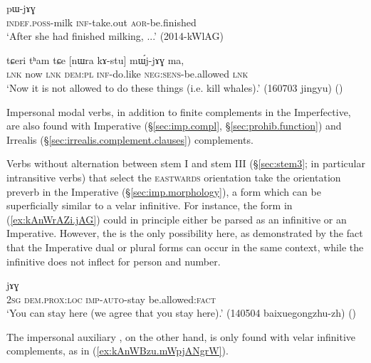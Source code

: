 \begin{exe} 
\ex \label{ex:kAtCAt.pWjAG}
\gll [tɤ-lu kɤ-tɕɤt] pɯ-jɤɣ \\
\textsc{indef}.\textsc{poss}-milk \textsc{inf}-take.out \textsc{aor}-be.finished \\
\glt `After she had finished milking, ...' (2014-kWlAG)
\end{exe} 

\begin{exe} 
\ex \label{ex:kAstu.mWjjAG}
\gll tɕeri tʰam tɕe [nɯra kɤ-stu] mɯ́j-jɤɣ ma,  \\
\textsc{lnk} now \textsc{lnk} \textsc{dem}:\textsc{pl} \textsc{inf}-do.like \textsc{neg}:\textsc{sens}-be.allowed \textsc{lnk} \\
\glt `Now it is not allowed to do these things (i.e. kill whales).' (160703 jingyu)
()
\end{exe} 

Impersonal modal verbs, in addition to finite complements in the Imperfective, are also found with Imperative (§\ref{sec:imp.compl}, §\ref{sec:prohib.function}) and Irrealis (§\ref{sec:irrealis.complement.clauses}) complements. 


Verbs without alternation between stem I and stem III (§\ref{sec:stem3}; in particular intransitive verbs) that select the \textsc{eastwards} orientation take the  orientation preverb in the Imperative (§\ref{sec:imp.morphology}), a form which can be superficially similar to a velar infinitive. For instance, the form  in (\ref{ex:kAnWrAZi.jAG}) could in principle either be parsed as an infinitive or an Imperative. However, the is the only possibility here, as demonstrated by the fact that the Imperative dual  or plural  forms can occur in the same context, while the infinitive does not inflect for person and number.


\begin{exe} 
\ex \label{ex:kAnWrAZi.jAG}
 jɤɣ \\
\textsc{2sg} \textsc{dem}.\textsc{prox}:\textsc{loc} \textsc{imp}-\textsc{auto}-stay be.allowed:\textsc{fact} \\
\glt `You can stay here (we agree that you stay here).' (140504 baixuegongzhu-zh)
()
\end{exe}

The impersonal auxiliary , on the other hand, is only found with velar infinitive complements, as in (\ref{ex:kAnWBzu.mWpjANgrW}).

